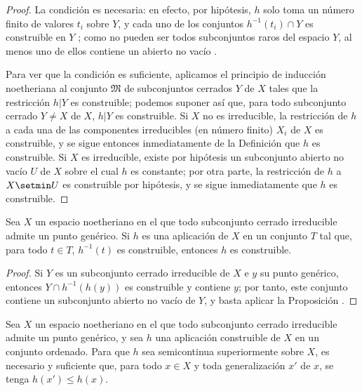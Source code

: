 \documentclass[oneside]{amsart}
\renewcommand{\leq}{\leqslant}
\newcommand{\oldpage}[2][]{{\marginnote{\normalfont\textbf{#1}~|~#2}}\ignorespaces}
\let\EGAOriginalLabel\label
\renewcommand{\label}[1]{\phantomsection\EGAOriginalLabel{#1}}
\begin{document}
\begin{proof}
La condición es necesaria: en efecto, por hipótesis, $h$ solo toma un número finito de valores $t_i$ sobre $Y$, y cada uno de los conjuntos $h^{-1}(t_i)\cap Y$ es construible en $Y$ ; como no pueden ser todos subconjuntos raros del espacio $Y$, al menos uno de ellos contiene un abierto no vacío .

\oldpage[0\textsubscript{III}]{17}
Para ver que la condición es suficiente, aplicamos el principio de inducción noetheriana al conjunto $\mathfrak{M}$ de subconjuntos cerrados $Y$ de $X$ tales que la restricción $h|Y$ es construible; podemos suponer así que, para todo subconjunto cerrado $Y\neq X$ de $X$,
$h|Y$ es construible.
Si $X$ no es irreducible, la restricción de $h$ a cada una de las componentes irreducibles (en número finito) $X_i$ de $X$ es construible, y se sigue entonces inmediatamente de la Definición  que $h$ es construible.
Si $X$ es irreducible, existe por hipótesis un subconjunto abierto no vacío $U$ de $X$ sobre el cual $h$ es constante; por otra parte, la restricción de $h$ a $X\setmin U$ es construible por hipótesis, y se sigue inmediatamente que $h$ es construible.
\end{proof}

\begin{corollary}[9.3.3]
\label{0.9.3.3}
Sea $X$ un espacio noetheriano en el que todo subconjunto cerrado irreducible admite un punto genérico.
Si $h$ es una aplicación de $X$ en un conjunto $T$ tal que, para todo $t\in T$, $h^{-1}(t)$ es construible, entonces $h$ es construible.
\end{corollary}

\begin{proof}
Si $Y$ es un subconjunto cerrado irreducible de $X$ e $y$ su punto genérico, entonces $Y\cap h^{-1}(h(y))$ es construible y contiene $y$; por tanto,  este conjunto contiene un subconjunto abierto no vacío de $Y$, y basta aplicar la Proposición .
\end{proof}

\begin{proposition}[9.3.4]
\label{0.9.3.4}
Sea $X$ un espacio noetheriano en el que todo subconjunto cerrado irreducible admite un punto genérico, y sea $h$ una aplicación construible de $X$ en un conjunto ordenado.
Para que $h$ sea semicontinua superiormente sobre $X$, es necesario y suficiente que, para todo $x\in X$ y toda generalización \textup{} $x'$ de $x$, se tenga $h(x')\leq h(x)$.
\end{proposition}
\end{document}
